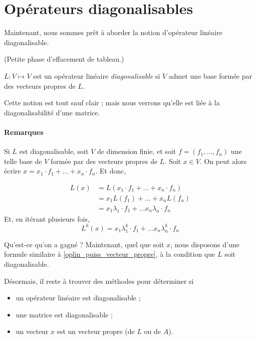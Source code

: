 \section{Opérateurs diagonalisables}

Maintenant, nous sommes prêt à aborder la notion d'opérateur linéaire diagonalisable.

(Petite phase d'effacement de tableau.)

\begin{defn}
$L \colon V \mapsto V$ est un opérateur linéaire \emph{diagonalisable} si $V$ admet une base formée par des vecteurs propres de $L$.
\end{defn}

Cette notion est tout sauf clair ; mais nous verrons qu'elle est liée à la diagonalisabilité d'une matrice.

\paragraph{Remarques}
Si $L$ est diagonalisable, soit $V$ de dimension finie, et soit $f=(f_1, \ldots, f_n)$ une telle base de $V$ formée par des vecteurs propres de $L$. Soit $x\in V$. On peut alors écrire $x=x_1 \cdot f_1 + \ldots + x_n \cdot f_n$. Et donc,

\begin{align*}
L(x) &= L(x_1 \cdot f_1 + \ldots + x_n \cdot f_n) \\
&= x_1 L(f_1) + \ldots + x_n L(f_n) \\
&= x_1 \lambda_1 \cdot f_1 + \ldots x_n \lambda_n \cdot f_n
\end{align*}
Et, en itérant plusieurs fois,
\begin{equation}
\label{oplin_puiss_opdiag}
L^k(x) = x_1 \lambda_1^k \cdot f_1 + \ldots x_n \lambda_n^k \cdot f_n
\end{equation}

Qu'est-ce qu'on a gagné ? Maintenant, quel que soit $x$, nous disposons d'une formule similaire à \ref{oplin_puiss_vecteur_propre}, à la condition que $L$ soit diagonalisable.

Désormais, il reste à trouver des méthodes pour déterminer si
\begin{itemize}
\item un opérateur linéaire est diagonalisable ;
\item une matrice est diagonalisable ;
\item un vecteur $x$ est un vecteur propre (de $L$ ou de $A$).
\end{itemize}

